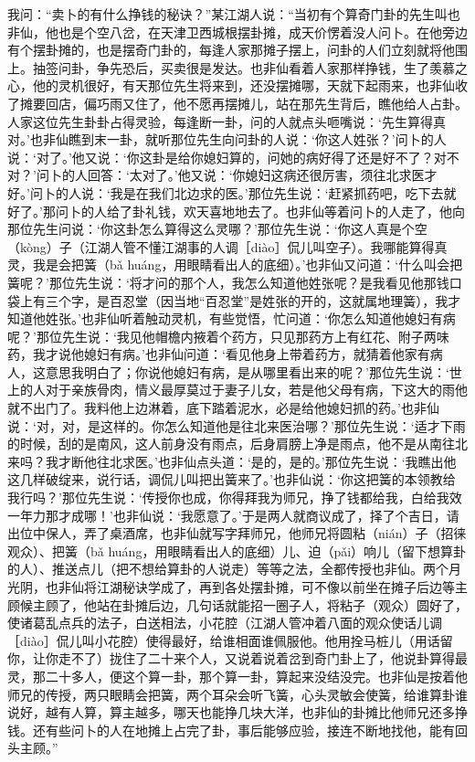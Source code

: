 \documentclass[12pt,UTF8]{ctexbook}
\begin{document}
我问：“卖卜的有什么挣钱的秘诀？”某江湖人说：“当初有个算奇门卦的先生叫也非仙，他也是个空八岔，在天津卫西城根摆卦摊，成天价愣着没人问卜。在他旁边有个摆卦摊的，也是摆奇门卦的，每逢人家那摊子摆上，问卦的人们立刻就将他围上。抽签问卦，争先恐后，买卖很是发达。也非仙看着人家那样挣钱，生了羡慕之心，他的灵机很好，有天那位先生将来到，还没摆摊哪，天就下起雨来，也非仙收了摊要回店，偏巧雨又住了，他不愿再摆摊儿，站在那先生背后，瞧他给人占卦。人家这位先生卦卦占得灵验，每逢断一卦，问的人就点头咂嘴说：‘先生算得真对。’也非仙瞧到末一卦，就听那位先生向问卦的人说：‘你这人姓张？’问卜的人说：‘对了。’他又说：‘你这卦是给你媳妇算的，问她的病好得了还是好不了？对不对？’问卜的人回答：‘太对了。’他又说：‘你媳妇这病还很厉害，须往北求医才好。’问卜的人说：‘我是在我们北边求的医。’那位先生说：‘赶紧抓药吧，吃下去就好了。’那问卜的人给了卦礼钱，欢天喜地地去了。也非仙等着问卜的人走了，他向那位先生问说：‘你这卦怎么算得这么灵哪？’那位先生说：‘你这人真是个空（kòng）子（江湖人管不懂江湖事的人调［diào］侃儿叫空子）。我哪能算得真灵，我是会把簧（bǎ huáng，用眼睛看出人的底细）。’也非仙又问道：‘什么叫会把簧呢？’那位先生说：‘将才问的那个人，我怎么知道他姓张呢？是我看见他那钱口袋上有三个字，是百忍堂（因当地“百忍堂”是姓张的开的，这就属地理簧），我才知道他姓张。’也非仙听着触动灵机，有些觉悟，忙问道：‘你怎么知道他媳妇有病呢？’那位先生说：‘我见他帽檐内掖着个药方，只见那药方上有红花、附子两味药，我才说他媳妇有病。’也非仙问道：‘看见他身上带着药方，就猜着他家有病人，这意思我明白了；你说他媳妇有病，是从哪里看出来的呢？’那位先生说：‘世上的人对于亲族骨肉，情义最厚莫过于妻子儿女，若是他父母有病，下这大的雨他就不出门了。我料他上边淋着，底下踏着泥水，必是给他媳妇抓的药。’也非仙说：‘对，对，是这样的。你怎么知道他是往北来医治哪？’那位先生说：‘适才下雨的时候，刮的是南风，这人前身没有雨点，后身肩膀上净是雨点，他不是从南往北来吗？我才断他往北求医。’也非仙点头道：‘是的，是的。’那位先生说：‘我瞧出他这几样破绽来，说行话，调侃儿叫把出簧来了。’也非仙说：‘你这把簧的本领教给我行吗？’那位先生说：‘传授你也成，你得拜我为师兄，挣了钱都给我，白给我效一年力那才成哪！’也非仙说：‘我愿意了。’于是两人就商议成了，择了个吉日，请出位中保人，弄了桌酒席，也非仙就写字拜师兄，他师兄将圆粘（nián）子（招徕观众）、把簧（bǎ huáng，用眼睛看出人的底细）儿、迫（pǎi）响儿（留下想算卦的人）、推送点儿（把不想给算卦的人说走）等等之法，全都传授也非仙。两个月光阴，也非仙将江湖秘诀学成了，再到各处摆卦摊，可不像以前坐在摊子后边等主顾候主顾了，他站在卦摊后边，几句话就能招一圈子人，将粘子（观众）圆好了，使诸葛乱点兵的法子，白送相法，小花腔（江湖人管冲着八面的观众使话儿调［diào］侃儿叫小花腔）使得最好，给谁相面谁佩服他。他用拴马桩儿（用话留你，让你走不了）拢住了二十来个人，又说着说着岔到奇门卦上了，他说卦算得最灵，那二十多人，便这个算一卦，那个算一卦，算起来没结没完。也非仙是按着他师兄的传授，两只眼睛会把簧，两个耳朵会听飞簧，心头灵敏会使簧，给谁算卦谁说好，越有人算，算主越多，哪天也能挣几块大洋，也非仙的卦摊比他师兄还多挣钱。还有些问卜的人在地摊上占完了卦，事后能够应验，接连不断地找他，能有回头主顾。”
\end{document}
